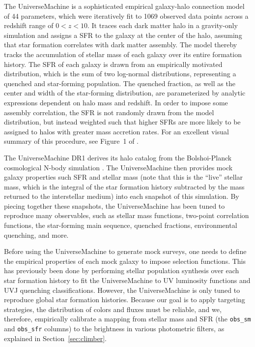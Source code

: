 \documentclass[twocolumn,twocolappendix]{aastex63}
\begin{document}
The UniverseMachine \citep{Behroozi:2019} is a sophisticated empirical galaxy-halo connection model of 44 parameters, which were iteratively fit to 1069 observed data points across a redshift range of $0<z<10$. It traces each dark matter halo in a gravity-only simulation and assigns a SFR to the galaxy at the center of the halo, assuming that star formation correlates with dark matter assembly. The model thereby tracks the accumulation of stellar mass of each galaxy over its entire formation history. The SFR of each galaxy is drawn from an empirically motivated distribution, which is the sum of two log-normal distributions, representing a quenched and star-forming population. The quenched fraction, as well as the center and width of the star-forming distribution, are parameterized by analytic expressions dependent on halo mass and redshift. In order to impose some assembly correlation, the SFR is not randomly drawn from the model distribution, but instead weighted such that higher SFRs are more likely to be assigned to halos with greater mass accretion rates. For an excellent visual summary of this procedure, see Figure~1 of \citet{Behroozi:2019}.

The UniverseMachine DR1 derives its halo catalog from the Bolshoi-Planck cosmological N-body simulation \citep{Klypin:2016}. The UniverseMachine then provides mock galaxy properties such SFR and stellar mass (note that this is the ``live'' stellar mass, which is the integral of the star formation history subtracted by the mass returned to the interstellar medium) into each snapshot of this simulation. By piecing together these snapshots, the UniverseMachine has been tuned to reproduce many observables, such as stellar mass functions, two-point correlation functions, the star-forming main sequence, quenched fractions, environmental quenching, and more.

Before using the UniverseMachine to generate mock surveys, one needs to define the empirical properties of each mock galaxy to impose selection functions.
This has previously been done by performing stellar population synthesis over each star formation history to fit the UniverseMachine to UV luminosity functions and UVJ quenching classifications. However, the UniverseMachine is only tuned to reproduce global star formation histories. Because our goal is to apply targeting strategies, the distribution of colors and fluxes must be reliable, and we, therefore, empirically calibrate a mapping from stellar mass and SFR (the \verb|obs_sm| and \verb|obs_sfr| columns) to the brightness in various photometric filters, as explained in Section~\ref{sec:climber}.
\end{document}
